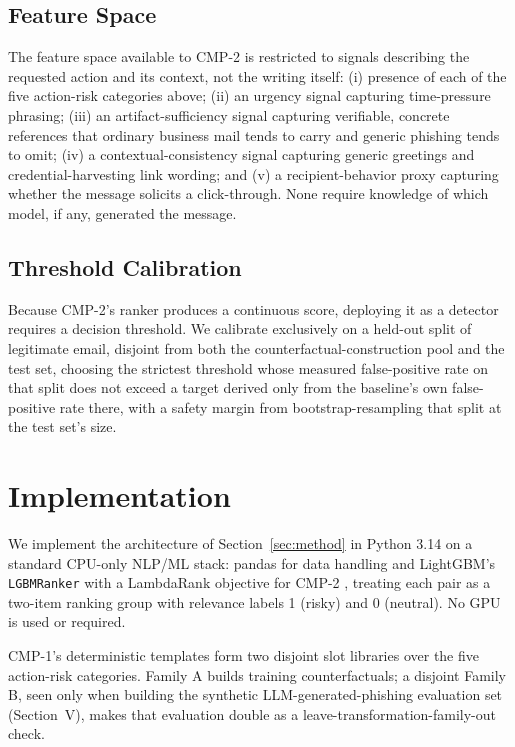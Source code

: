 \documentclass[conference]{IEEEtran}
\begin{document}
\subsection{Feature Space}

The feature space available to CMP-2 is restricted to signals describing the requested action and its context, not the writing itself: (i) presence of each of the five action-risk categories above; (ii) an urgency signal capturing time-pressure phrasing; (iii) an artifact-sufficiency signal capturing verifiable, concrete references that ordinary business mail tends to carry and generic phishing tends to omit; (iv) a contextual-consistency signal capturing generic greetings and credential-harvesting link wording; and (v) a recipient-behavior proxy capturing whether the message solicits a click-through. None require knowledge of which model, if any, generated the message.

\subsection{Threshold Calibration}

Because CMP-2's ranker produces a continuous score, deploying it as a detector requires a decision threshold. We calibrate exclusively on a held-out split of legitimate email, disjoint from both the counterfactual-construction pool and the test set, choosing the strictest threshold whose measured false-positive rate on that split does not exceed a target derived only from the baseline's own false-positive rate there, with a safety margin from bootstrap-resampling that split at the test set's size.

\section{Implementation}

We implement the architecture of Section~\ref{sec:method} in Python 3.14 on a standard CPU-only NLP/ML stack: pandas for data handling and LightGBM's \texttt{LGBMRanker} with a LambdaRank objective for CMP-2 \cite{ke2017lightgbm,burges2010lambdamart}, treating each pair as a two-item ranking group with relevance labels 1 (risky) and 0 (neutral). No GPU is used or required.

CMP-1's deterministic templates form two disjoint slot libraries over the five action-risk categories. Family A builds training counterfactuals; a disjoint Family B, seen only when building the synthetic LLM-generated-phishing evaluation set (Section~V), makes that evaluation double as a leave-transformation-family-out check.
\end{document}
